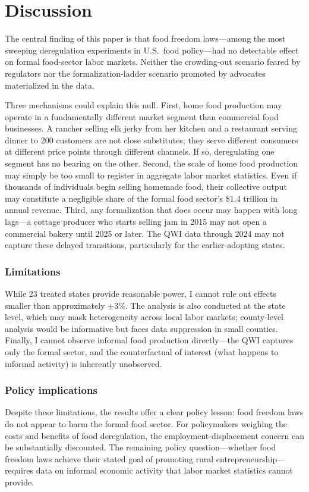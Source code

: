 \documentclass[12pt]{article}
\begin{document}
\section{Discussion}
\label{sec:discussion}

The central finding of this paper is that food freedom laws---among the most sweeping deregulation experiments in U.S.\ food policy---had no detectable effect on formal food-sector labor markets. Neither the crowding-out scenario feared by regulators nor the formalization-ladder scenario promoted by advocates materialized in the data.

Three mechanisms could explain this null. First, home food production may operate in a fundamentally different market segment than commercial food businesses. A rancher selling elk jerky from her kitchen and a restaurant serving dinner to 200 customers are not close substitutes; they serve different consumers at different price points through different channels. If so, deregulating one segment has no bearing on the other. Second, the scale of home food production may simply be too small to register in aggregate labor market statistics. Even if thousands of individuals begin selling homemade food, their collective output may constitute a negligible share of the formal food sector's \$1.4 trillion in annual revenue. Third, any formalization that does occur may happen with long lags---a cottage producer who starts selling jam in 2015 may not open a commercial bakery until 2025 or later. The QWI data through 2024 may not capture these delayed transitions, particularly for the earlier-adopting states.

\subsubsection*{Limitations} While 23 treated states provide reasonable power, I cannot rule out effects smaller than approximately $\pm 3\%$. The analysis is also conducted at the state level, which may mask heterogeneity across local labor markets; county-level analysis would be informative but faces data suppression in small counties. Finally, I cannot observe informal food production directly---the QWI captures only the formal sector, and the counterfactual of interest (what happens to informal activity) is inherently unobserved.

\subsubsection*{Policy implications} Despite these limitations, the results offer a clear policy lesson: food freedom laws do not appear to harm the formal food sector. For policymakers weighing the costs and benefits of food deregulation, the employment-displacement concern can be substantially discounted. The remaining policy question---whether food freedom laws achieve their stated goal of promoting rural entrepreneurship---requires data on informal economic activity that labor market statistics cannot provide.
\end{document}
